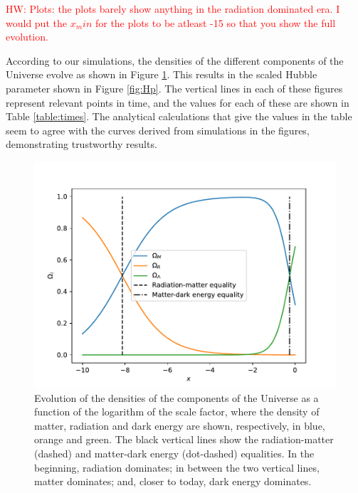 \documentclass{aa}
\newcommand{\hw}[1]{\textcolor{red}{HW: #1}}
\begin{document}
\hw{Plots: the plots barely show anything in the radiation dominated era. I would put the $x_min$ for the plots to be atleast -15 so that you show the full evolution.}

According to our simulations, the densities of the different components of the Universe evolve as shown in Figure \ref{fig:Omegas}. This results in the scaled Hubble parameter shown in Figure \ref{fig:Hp}. The vertical lines in each of these figures represent relevant points in time, and the values for each of these are shown in Table \ref{table:times}. The analytical calculations that give the values in the table seem to agree with the curves derived from simulations in the figures, demonstrating trustworthy results.

\begin{figure}[ht]
\centering
\includegraphics[width=\hsize]{figures/Omegas.pdf}
  \caption{Evolution of the densities of the components of the Universe as a function of the logarithm of the scale factor, where the density of matter, radiation and dark energy are shown, respectively, in blue, orange and green. The black vertical lines show the radiation-matter (dashed) and matter-dark energy (dot-dashed) equalities. In the beginning, radiation dominates; in between the two vertical lines, matter dominates; and, closer to today, dark energy dominates.}
     \label{fig:Omegas}
\end{figure}
\end{document}
